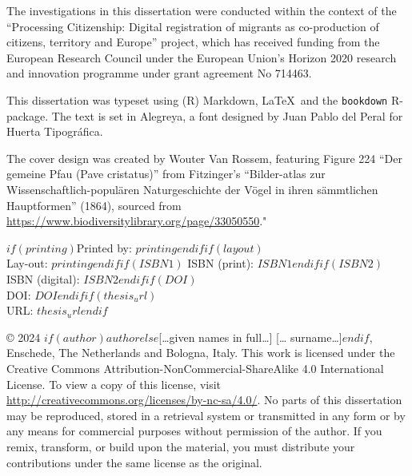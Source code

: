 \documentclass[$if(fontsize)$$fontsize$,$endif$$if(papersize)$$papersize$paper,twoside,$endif$$for(classoption)$$classoption$$sep$,$endfor$]{$documentclass$} %
\begin{document}
\vspace*{\fill}
\begingroup %
\small
\setlength{\parskip}{\baselineskip} %
\setlength\parindent{0pt} %
The investigations in this dissertation were conducted within the context of the “Processing Citizenship: Digital registration of migrants as co-production of citizens, territory and Europe” project, which has received funding from the European Research Council under the European Union’s Horizon 2020 research and innovation programme under grant agreement No 714463.

\vspace{\baselineskip}

This dissertation was typeset using (R) Markdown, \LaTeX\ and the \verb+bookdown+ R-package. The text is set in Alegreya, a font designed by Juan Pablo del Peral for Huerta Tipográfica.

\vspace{\baselineskip}

The cover design was created by Wouter Van Rossem, featuring Figure 224 “Der gemeine Pfau (Pave cristatus)” from Fitzinger’s “Bilder-atlas zur Wissenschaftlich-populären Naturgeschichte der Vögel in ihren sämmtlichen Hauptformen” (1864), sourced from \url{https://www.biodiversitylibrary.org/page/33050550}."
\vspace{\baselineskip}

$if(printing)$Printed by: $printing$$endif$$if(layout)$\\ Lay-out: $printing$$endif$$if(ISBN1)$ ISBN (print): $ISBN1$$endif$$if(ISBN2)$\\ ISBN (digital): $ISBN2$$endif$$if(DOI)$\\ DOI: $DOI$$endif$$if(thesis_url)$\\ URL: $thesis_url$$endif$


\vspace{\baselineskip}

© 2024 $if(author)$$author$$else$[…given names in full…] [… surname…]$endif$, Enschede, The Netherlands and Bologna, Italy. This work is licensed under the Creative Commons Attribution-NonCommercial-ShareAlike 4.0 International License. To view a copy of this license, visit \url{http://creativecommons.org/licenses/by-nc-sa/4.0/}. No parts of this dissertation may be reproduced, stored in a retrieval system or transmitted in any form or by any means for commercial purposes without permission of the author. If you remix, transform, or build upon the material, you must distribute your contributions under the same license as the original.
\endgroup
\end{document}
